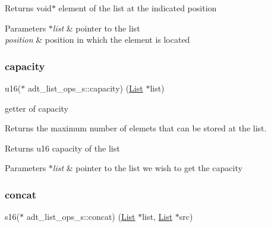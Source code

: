 \begin{DoxyReturn}{Returns}
void$\ast$ element of the list at the indicated position 
\end{DoxyReturn}

\begin{DoxyParams}{Parameters}
{\em $\ast$list} & pointer to the list \\
\hline
{\em position} & position in which the element is located \\
\hline
\end{DoxyParams}
\mbox{\label{structadt__list__ops__s_a739fb8b630a36bcffd0182c82b6eaa9a}} 
\subsubsection{\texorpdfstring{capacity}{capacity}}
{\footnotesize\ttfamily u16($\ast$ adt\+\_\+list\+\_\+ops\+\_\+s\+::capacity) (\hyperlink{structadt__list__s}{List} $\ast$list)}



getter of capacity 

Returns the maximum number of elemets that can be stored at the list.

\begin{DoxyReturn}{Returns}
u16 capacity of the list 
\end{DoxyReturn}

\begin{DoxyParams}{Parameters}
{\em $\ast$list} & pointer to the list we wish to get the capacity \\
\hline
\end{DoxyParams}
\mbox{\label{structadt__list__ops__s_aa11ea043b92b43346566184554a7f492}} 
\subsubsection{\texorpdfstring{concat}{concat}}
{\footnotesize\ttfamily s16($\ast$ adt\+\_\+list\+\_\+ops\+\_\+s\+::concat) (\hyperlink{structadt__list__s}{List} $\ast$list, \hyperlink{structadt__list__s}{List} $\ast$src)}




